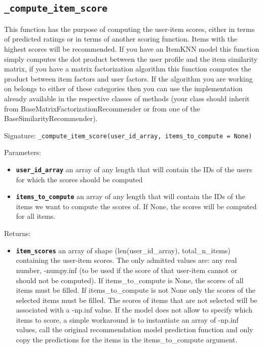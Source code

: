 \subsection{\texttt{\_compute\_item\_score}}
This function has the purpose of computing the user-item scores, either in terms of predicted ratings or in terms of another scoring function. Items with the highest scores will be recommended.
If you have an ItemKNN model this function simply computes the dot product between the user profile and the item similarity matrix, if you have a matrix factorization algorithm this function computes the product between item factors and user factors. If the algorithm you are working on belongs to either of these categories then you can use the implementation already available in the respective classes of methods (your class should inherit from BaseMatrixFactorizationRecommender or from one of the BaseSimilarityRecommender).


Signature: \texttt{\_compute\_item\_score(user\_id\_array, items\_to\_compute = None)}

Parameters:
\begin{itemize}
    \item \textbf{\texttt{user\_id\_array}} an array of any length that will contain the IDs of the users for which the scores should be computed
    \item \textbf{\texttt{items\_to\_compute}} an array of any length that will contain the IDs of the items we want to compute the scores of. If None, the scores will be computed for all items.

\end{itemize}

Returns:
\begin{itemize}
    \item \textbf{\texttt{item\_scores}} an array of shape (len(user\_id\_array), total\_n\_items) containing the user-item scores. The only admitted values are: any real number, -numpy.inf (to be used if the score of that user-item cannot or should not be computed). If items\_to\_compute is None, the scores of all items must be filled. If items\_to\_compute is not None only the scores of the selected items must be filled. The scores of items that are not selected will be associated with a -np.inf value. If the model does not allow to specify which items to score, a simple workaround is to instantiate an array of -np.inf values, call the original recommendation model prediction function and only copy the predictions for the items in the items\_to\_compute argument.
\end{itemize}




